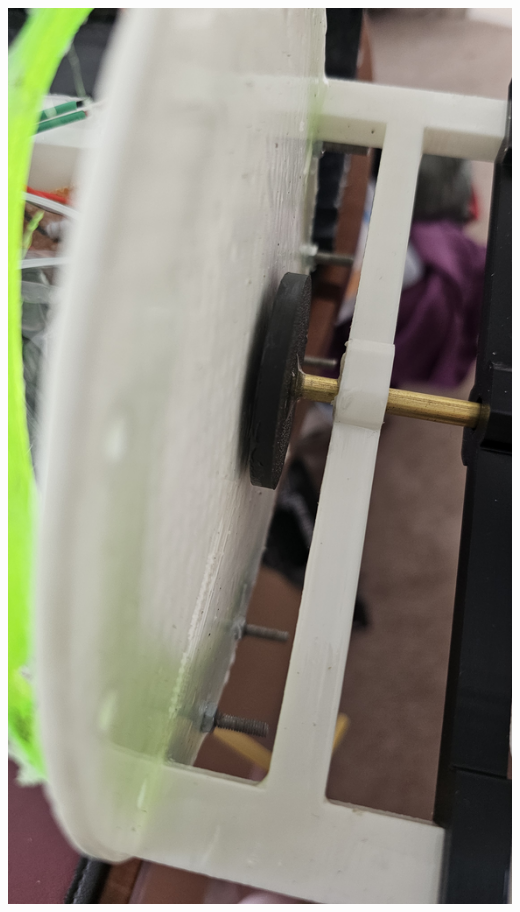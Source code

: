 \documentclass[11pt,a4paper,titlepage]{report}
\begin{document}
	\begin{center}
		\label{picture:images_parts_6}
		\includegraphics[width=\linewidth]{assets/MainProp2.jpg}
	\end{center}
\end{document}
